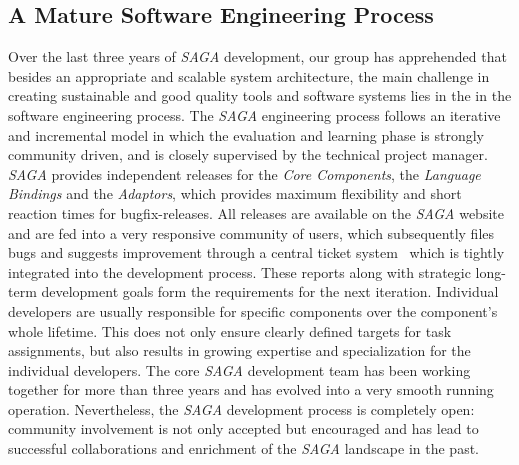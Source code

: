 \documentclass[a4paper,10pt]{article}
\newcommand{\I}[1]{\textit{#1}}
\newcommand{\sagaimpl}{\textit{SAGA}\xspace}
\newcommand{\impl}{\sagaimpl}
\begin{document}
\vspace{-0.8em}


\subsection*{A Mature Software Engineering Process\label{engineering}}
\vspace{-0.5em}

 Over the last three years of \impl development, our group has apprehended 
 that besides an appropriate and scalable system architecture, the main challenge in
 creating sustainable and good quality tools and software systems lies 
 in the in the software engineering process. The \impl engineering process follows an iterative and incremental
 model in which the evaluation and learning phase is strongly
 community driven, and is closely supervised by the technical project
 manager.  \impl provides independent releases for the \I{Core
 Components}, the \I{Language Bindings} and the \I{Adaptors}, which
 provides maximum flexibility and short reaction times for
 bugfix-releases. All releases are available on the \impl
 website~\cite{saga_downloads_web} and are fed into a very responsive
 community of users, which subsequently files bugs and suggests
 improvement through a central ticket
 system~\cite{saga_bugtracking_web} which is tightly integrated into
 the development process. These reports along with strategic long-term
 development goals form the requirements for the next iteration.
 Individual developers are usually responsible for specific components
 over the component's whole lifetime. This does not only ensure
 clearly defined targets for task assignments, but also results in
 growing expertise and specialization for the individual developers.
 The core \impl development team has been working together for more
 than three years and has evolved into a very smooth running
 operation.  Nevertheless, the \impl development process is completely
 open: community involvement is not only accepted but encouraged and
 has lead to successful collaborations and enrichment of the \impl
 landscape in the past.
\end{document}
